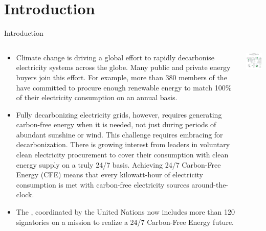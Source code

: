\section{Introduction}


\begin{frame}{Introduction}

  {\footnotesize
  \centering
  \begin{columns}[T]
  \begin{column}{9cm}
    \begin{itemize}
    \item Climate change is driving a global effort to \alert{rapidly decarbonise} 
    electricity systems across the globe. Many public and private energy buyers join this effort. For example, more than 380 members of the  have committed to procure enough renewable energy to match 100\% of their electricity consumption on an annual basis.

    \item Fully decarbonizing electricity grids, however, requires generating carbon-free energy when it is needed, not just during periods of abundant sunshine or wind. This challenge requires embracing  for decarbonization. 
    There is growing interest from leaders in voluntary clean  electricity procurement to cover their consumption with clean energy supply on a \alert{truly 24/7 basis}.  Achieving 24/7 Carbon-Free Energy (CFE) means that every kilowatt-hour of electricity consumption is met
    with carbon-free electricity sources around-the-clock.

    \item The , coordinated by the United Nations now includes more than 120 signatories on a mission to realize a 24/7 Carbon-Free Energy future. 

    \end{itemize}
    \end{column}

    \begin{column}{6cm}
    \centering
    \vspace{0.3cm}
    \includegraphics[width=6cm]{images/247-google-web.png}
    \vspace{.1cm}
  \end{column}


\end{columns}}
\end{frame}
